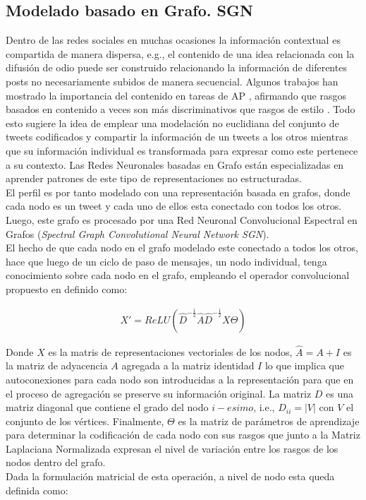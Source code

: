 	\subsection{Modelado basado en Grafo. SGN}\label{sgn}
	
	Dentro de las redes sociales en muchas ocasiones la información contextual es compartida de manera dispersa, e.g., el contenido de una idea relacionada con la difusión de odio puede ser construido relacionando la información de diferentes posts no necesariamente subidos de manera secuencial. Algunos trabajos han mostrado la importancia del contenido en tareas de AP \citep{OrtegaMendoza2018EmphasizingPI}, afirmando que rasgos basados en contenido a veces son más discriminativos que rasgos de estilo \citep{reddy2016survey}. Todo esto sugiere la idea de emplear una modelación no euclidiana del conjunto de tweets codificados y compartir la información de un tweets a los otros mientras que su información individual es transformada para expresar como este pertenece a su contexto.
	Las Redes Neuronales basadas en Grafo están especializadas en aprender patrones de este tipo de representaciones no estructuradas.
	\\
	El perfil es por tanto modelado con una representación basada en grafos, donde cada nodo es un tweet y cada uno de ellos esta conectado con todos los otros. Luego, este grafo es procesado por una Red Neuronal Convolucional Espectral en Grafos (\textit{Spectral Graph Convolutional Neural Network SGN}).
	\\
	El hecho de que cada nodo en el grafo modelado este conectado a todos los otros, hace que luego de un ciclo de paso de mensajes, un nodo individual, tenga conocimiento sobre cada nodo en el grafo, empleando el operador convolucional propuesto en \citep{kipf2017semisupervised} definido como:
	
	\begin{align}\label{matrix-wise}
		X' = ReLU(\hat{D}^{-\frac{1}{2}}\hat{A}\hat{D}^{-\frac{1}{2}}X\Theta)
	\end{align}
	
	Donde $X$ es la matris de representaciones vectoriales de los nodos, $\hat{A} = A + I$ es la matriz de adyacencia $A$ agregada a la matriz identidad $I$ lo que implica que autoconexiones para cada nodo son introducidas a la representación para que en el proceso de agregación se preserve su información original. La matriz $D$ es una matriz diagonal que contiene el grado del nodo $i-esimo$, i.e., $D_{ii} = |V|$ con $V$ el conjunto de los vértices. Finalmente, $\Theta$ es la matriz de parámetros de aprendizaje para determinar la codificación de cada nodo con sus rasgos que junto a la Matriz Laplaciana Normalizada expresan el nivel de variación entre los rasgos de los nodos dentro del grafo.
	\\
	Dada la formulación matricial de esta operación, a nivel de nodo esta queda definida como: 
	

